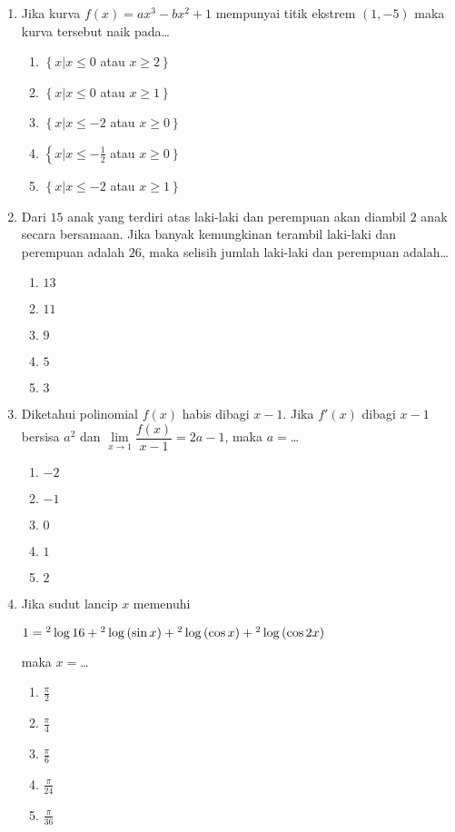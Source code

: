 \documentclass[A4,12PT, english, twocolumn]{journal}
\begin{document}
\begin{enumerate}
\item Jika kurva $f(x)=ax^3-bx^2+1$ mempunyai titik ekstrem $(1,-5)$ maka kurva tersebut naik pada\dots
    \begin{enumerate}
        \item $\left\{ x| x \leq 0 \right.$ atau $\left. x \geq 2 \right\}$
        \item $\left\{ x| x \leq 0 \right.$ atau $\left. x \geq 1 \right\}$
        \item $\left\{ x| x \leq -2 \right.$ atau $\left. x \geq 0 \right\}$
        \item $\left\{ x| x \leq -\frac{1}{2} \right.$ atau $\left. x \geq 0 \right\}$
        \item $\left\{ x| x \leq -2 \right.$ atau $\left. x \geq 1 \right\}$
    \end{enumerate}

\item Dari $15$ anak yang terdiri atas laki-laki dan perempuan akan diambil $2$ anak secara bersamaan. Jika banyak kemungkinan terambil laki-laki dan perempuan adalah $26$, maka selisih jumlah laki-laki dan perempuan adalah\dots
    \begin{enumerate}
        \item $13$
        \item $11$
        \item $9$
        \item $5$
        \item $3$
    \end{enumerate}

\item Diketahui polinomial $f(x)$ habis dibagi $x-1$. Jika $f'(x)$ dibagi $x-1$ bersisa $a^2$ dan $\lim\limits_{x \longrightarrow 1} \dfrac{f(x)}{x-1}=2a-1$, maka $a=$\dots
    \begin{enumerate}
        \item $-2$
        \item $-1$
        \item $0$
        \item $1$
        \item $2$
    \end{enumerate}

\item Jika sudut lancip $x$ memenuhi
\begin{center}
    $1={}^2\Log{16}+{}^2\Log{(\sin{x})}+{}^2\Log{(\cos{x})}+{}^2\Log{(\cos{2x})}$
\end{center}
maka $x=$\dots
    \begin{enumerate}
        \item $\frac{\pi}{2}$
        \item $\frac{\pi}{4}$
        \item $\frac{\pi}{6}$
        \item $\frac{\pi}{24}$
        \item $\frac{\pi}{36}$
    \end{enumerate}
    

\end{enumerate}
\end{document}

